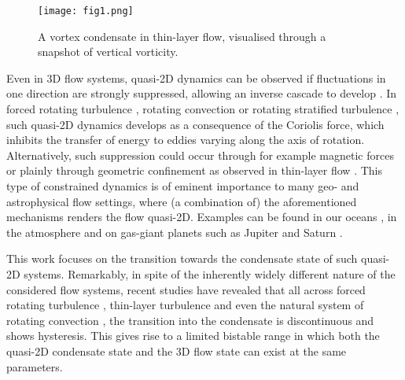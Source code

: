 \documentclass[]{jfm}
\begin{document}
\begin{figure}
    \centering
    \texttt{[image: fig1.png]}
    \caption{A vortex condensate in thin-layer flow, visualised through a snapshot of vertical vorticity.}
    \label{fig:condensate_snap}
\end{figure}

Even in 3D flow systems, quasi-2D dynamics can be observed if fluctuations in one direction are strongly suppressed, allowing an inverse cascade to develop \citep{Alexakis2018}. In forced rotating turbulence \citep{Biferale2016,Mininni2009,Smith1996,Smith1999}, rotating convection \citep{Favier2014,Guervilly2014,Julien2012,Rubio2014} or rotating stratified turbulence \citep{Pouquet2013,Marino2013,Marino2014,VanKan2020}, such quasi-2D dynamics develops as a consequence of the Coriolis force, which inhibits the transfer of energy to eddies varying along the axis of rotation. Alternatively, such suppression could occur through for example magnetic forces \citep{Alexakis2011,Baker2018,Favier2010,Reddy2014} or plainly through geometric confinement as observed in thin-layer flow \citep{Celani2010,Benavides2017,Musacchio2017,Musacchio2019}. This type of constrained dynamics is of eminent importance to many geo- and astrophysical flow settings, where (a combination of) the aforementioned mechanisms renders the flow quasi-2D. Examples can be found in our oceans \citep{King2015,Scott2005}, in the atmosphere \citep{Byrne2013,Nastrom1984} and on gas-giant planets such as Jupiter and Saturn \citep{Heimpel2007,Heimpel2016,Stellmach2016}.

This work focuses on the transition towards the condensate state of such quasi-2D systems. Remarkably, in spite of the inherently widely different nature of the considered flow systems, recent studies have revealed that all across forced rotating turbulence \citep{Alexakis2015,Seshasayanan2018,Yokoyama2017}, thin-layer turbulence \citep{VanKan2019} and even the natural system of rotating convection \citep{Favier2019,DeWit2022}, the transition into the condensate is discontinuous and shows hysteresis. This gives rise to a limited bistable range in which both the quasi-2D condensate state and the 3D flow state can exist at the same parameters.
\end{document}
